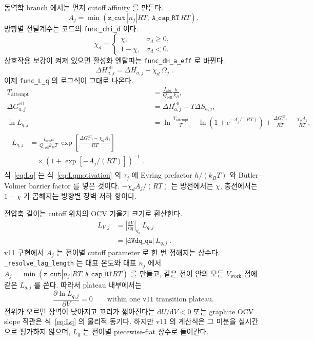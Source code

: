 \documentclass[11pt,a4paper]{article}
\newcommand{\dd}{\mathrm{d}}
\newcommand{\cellc}{\mathrm{cell}}
\newcommand{\eff}{\mathrm{eff}}
\newcommand{\work}{\mathrm{work}}
\newcommand{\abs}{\mathrm{abs}}
\begin{document}
동역학 branch 에서는 먼저 cutoff affinity 를 만든다.
\begin{equation}
A_j=\min\!\left(\texttt{z\_cut}\,|n_j|RT,\ \texttt{A\_cap\_RT}\,RT\right).
\label{eq:Acut}
\end{equation}
방향별 전달계수는 코드의 \texttt{func\_chi\_d} 이다.
\begin{equation}
\boxed{\;\chi_d=
\begin{cases}
\chi,&\sigma_d\ge0,\\
1-\chi,&\sigma_d<0.
\end{cases}\;}
\label{eq:chid}
\end{equation}
상호작용 보강이 켜져 있으면 활성화 엔탈피는 \texttt{func\_dH\_a\_eff} 로 바뀐다.
\begin{equation}
\boxed{\;\Delta H_{a,j}^{\eff}=\Delta H_{a,j}-\chi_d\,\Omega_j\;.}
\label{eq:dHeff}
\end{equation}
이제 \texttt{func\_L\_q} 의 로그식이 그대로 나온다.
\begin{align}
T_{\mathrm{attempt}}&=\frac{I_{\abs}}{Q_{\cellc}}\frac{h}{k_B},\label{eq:Tattempt}\\
\Delta G_{a,j}^{\eff}&=\Delta H_{a,j}^{\eff}-T\Delta S_{a,j},\label{eq:dGeff}\\
\ln L_{q,j}
&=\ln\frac{T_{\mathrm{attempt}}}{T}
-\ln\!\left(1+e^{-A_j/(RT)}\right)
+\frac{\Delta G_{a,j}^{\eff}}{RT}
-\frac{\chi_d A_j}{RT},\label{eq:lnLq}\\
\boxed{\;\begin{aligned}
L_{q,j}
&=\frac{I_{\abs}h}{Q_{\cellc}k_BT}\,
\exp\!\left[\frac{\Delta G_{a,j}^{\eff}-\chi_d A_j}{RT}\right]\\
&\quad{}\times\left(1+\exp[-A_j/(RT)]\right)^{-1}\;.
\end{aligned}}
\label{eq:Lq}
\end{align}
식~\eqref{eq:Lq} 는 식~\eqref{eq:Lqmotivation} 의 $\tau_j$ 에 Eyring prefactor $h/(k_BT)$ 와 Butler--Volmer barrier factor 를 넣은 것이다. $-\chi_d A_j/(RT)$ 는 방전에서는 $\chi$, 충전에서는 $1-\chi$ 가 곱해지는 방향별 장벽 저하 항이다.

전압축 길이는 cutoff 위치의 OCV 기울기 크기로 환산한다.
\begin{equation}
\boxed{\;\begin{aligned}
L_{V,j}
&=\left|\frac{\dd V}{\dd q}\right|_{q_a}\,L_{q,j}\\
&=|\texttt{dVdq\_qa}|\,L_{q,j}\;.
\end{aligned}}
\label{eq:LV}
\end{equation}
v11 구현에서 $A_j$ 는 전이별 cutoff parameter 로 한 번 정해지는 상수다. \texttt{\_resolve\_lag\_length} 는 대표 온도와 대표 $n_j$ 에서 $A_j=\min(\texttt{z\_cut}|n_j|RT,\texttt{A\_cap\_RT}RT)$ 를 만들고, 같은 전이 안의 모든 $V_{\work}$ 점에 같은 $L_{q,j}$ 를 쓴다. 따라서 plateau 내부에서는
\begin{equation}
\frac{\partial \ln L_{q,j}}{\partial V}=0
\qquad\text{within one v11 transition plateau.}
\label{eq:Lqflat}
\end{equation}
전위가 오르면 장벽이 낮아지고 꼬리가 짧아진다는 $\dd U/\dd V<0$ 또는 graphite OCV slope 직관은 식~\eqref{eq:Lq} 의 물리적 동기다. 하지만 v11 의 계산식은 그 미분을 실시간으로 평가하지 않으며, $L_q$ 는 전이별 piecewise-flat 상수로 들어간다.
\end{document}
